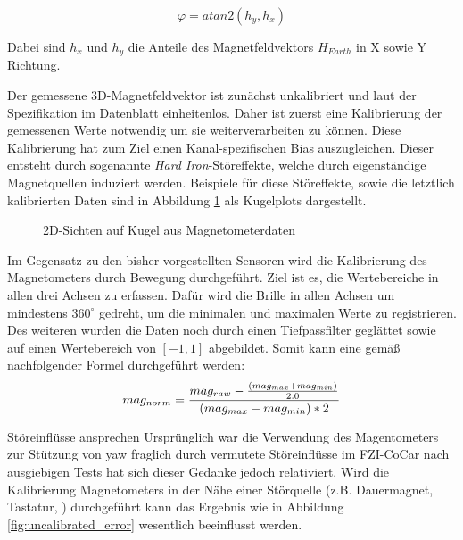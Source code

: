 \begin{equation}
    \varphi = atan2(h_y,h_x)
\end{equation}

Dabei sind $h_x$ und $h_y$ die Anteile des Magnetfeldvektors $H_{Earth}$ in X sowie Y Richtung.

Der gemessene 3D-Magnetfeldvektor ist zunächst unkalibriert und laut der Spezifikation im Datenblatt  einheitenlos.
Daher ist zuerst eine Kalibrierung der gemessenen Werte notwendig um sie weiterverarbeiten zu können. 
Diese Kalibrierung hat zum Ziel einen Kanal-spezifischen Bias auszugleichen. 
Dieser entsteht durch sogenannte \textit{Hard Iron}-Störeffekte, welche durch eigenständige Magnetquellen induziert werden.
Beispiele für diese Störeffekte, sowie die letztlich kalibrierten Daten sind in Abbildung \ref{fig:mag_kugel_plots} als Kugelplots dargestellt.

\begin{figure}[ht]
\centering
{}

\caption[]{2D-Sichten auf Kugel aus Magnetometerdaten}
\label{fig:mag_kugel_plots}
\end{figure}

Im Gegensatz zu den bisher vorgestellten Sensoren wird die Kalibrierung des Magnetometers durch Bewegung durchgeführt.
Ziel ist es, die Wertebereiche in allen drei Achsen zu erfassen.
Dafür wird die Brille in allen Achsen um mindestens $360^\circ$ gedreht, um die minimalen und maximalen Werte zu registrieren. Des weiteren wurden die Daten noch durch einen Tiefpassfilter geglättet sowie auf einen Wertebereich von $[-1,1]$ abgebildet. Somit kann eine gemäß nachfolgender Formel durchgeführt werden:
\begin{equation}
    mag_{norm} = {mag_{raw} - {(mag_{max} + mag_{min})\over 2.0} \over (mag_{max} - mag_{min}) * 2}
\end{equation}

Störeinflüsse ansprechen
Ursprünglich war die Verwendung des Magentometers zur Stützung von yaw fraglich durch vermutete Störeinflüsse im FZI-CoCar nach ausgiebigen Tests hat sich dieser Gedanke jedoch relativiert. Wird die Kalibrierung Magnetometers in der Nähe einer Störquelle (z.B. Dauermagnet, Tastatur, \oae) durchgeführt kann das Ergebnis wie in Abbildung \ref{fig:uncalibrated_error} wesentlich beeinflusst werden.

